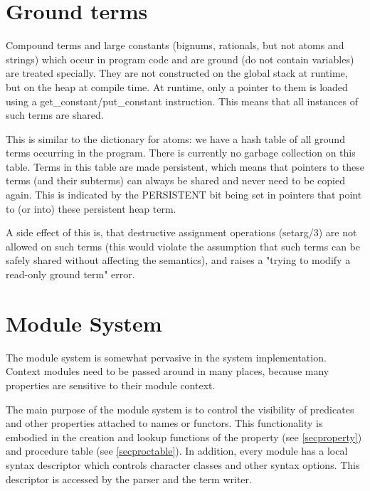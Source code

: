 \section{Ground terms}
\label{secgroundconst}
Compound terms and large constants (bignums,
rationals, but not atoms and strings) which occur in program code and
are ground (do not contain variables) are treated specially.  They are
not constructed on the global stack at runtime, but on the heap at
compile time.  At runtime, only a pointer to them is loaded using a
get_constant/put_constant instruction.  This means that all instances
of such terms are shared.

This is similar to the dictionary for atoms:  we
have a hash table of all ground terms occurring in the program.  There
is currently no garbage collection on this table.  Terms in this table
are made persistent, which means that pointers to these terms (and
their subterms) can always be shared and never need to be copied
again.  This is indicated by the PERSISTENT bit
being set in pointers that point to (or into) these persistent heap
term.

A side effect of this is, that destructive assignment operations
(setarg/3) are not allowed on such terms (this would violate the
assumption that such terms can be safely shared without affecting the
semantics), and raises a "trying to modify a read-only ground term" error.


\section{Module System}

The module system is somewhat pervasive in the {\eclipse} system
implementation.  Context modules need to be passed around in many
places, because many properties are sensitive to their module context.

The main purpose of the module system is to control the visibility
of predicates  and other properties  attached to names or functors.
This functionality is embodied in the creation and lookup functions
of the property
(see \ref{secproperty})
and procedure table
(see \ref{secproctable}).
In addition, every module has a local syntax  descriptor which controls
character classes and other syntax options.
This descriptor is accessed by the parser and the term writer.

